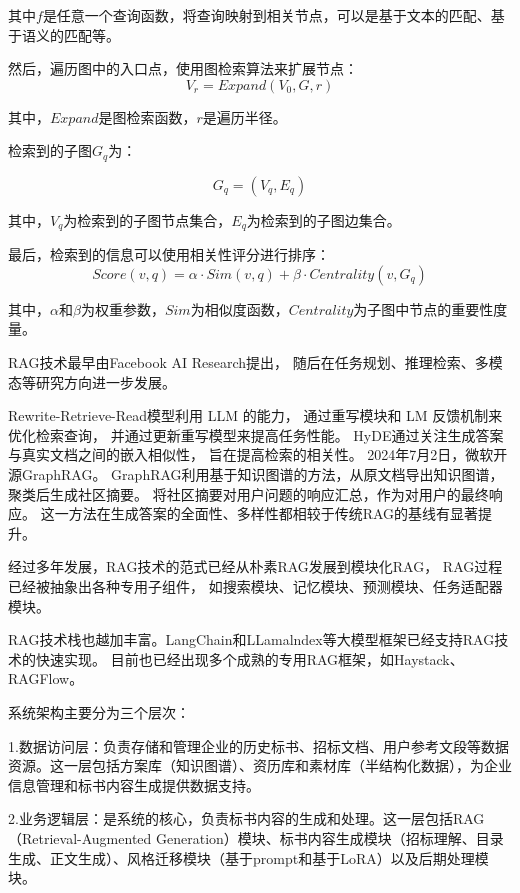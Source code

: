 \documentclass{xmu}
\begin{document}
其中$f$是任意一个查询函数，将查询映射到相关节点，可以是基于文本的匹配、基于语义的匹配等。

然后，遍历图中的入口点，使用图检索算法来扩展节点：
$$
V_r = Expand(V_0, G, r)
$$

其中，$Expand$是图检索函数，$r$是遍历半径。

检索到的子图$G_q$为：

$$
G_q = (V_q, E_q)
$$

其中，$V_q$为检索到的子图节点集合，$E_q$为检索到的子图边集合。

最后，检索到的信息可以使用相关性评分进行排序：
$$
Score(v, q) = \alpha \cdot Sim(v, q) + \beta \cdot Centrality(v, G_q)
$$

其中，$\alpha$和$\beta$为权重参数，$Sim$为相似度函数，$Centrality$为子图中节点的重要性度量。

RAG技术最早由Facebook AI Research提出，
随后在任务规划、推理检索、多模态等研究方向进一步发展。

Rewrite-Retrieve-Read模型利用 LLM 的能力，
通过重写模块和 LM 反馈机制来优化检索查询，
并通过更新重写模型来提高任务性能\cite{RRR}。
HyDE通过关注生成答案与真实文档之间的嵌入相似性，
旨在提高检索的相关性\cite{HyDE}。
2024年7月2日，微软开源GraphRAG\cite{graphRAG}。
GraphRAG利用基于知识图谱的方法，从原文档导出知识图谱，聚类后生成社区摘要。
将社区摘要对用户问题的响应汇总，作为对用户的最终响应。
这一方法在生成答案的全面性、多样性都相较于传统RAG的基线有显著提升。

经过多年发展，RAG技术的范式已经从朴素RAG发展到模块化RAG，
RAG过程已经被抽象出各种专用子组件，
如搜索模块、记忆模块、预测模块、任务适配器模块。\cite{RAG}

RAG技术栈也越加丰富。LangChain和LLamalndex等大模型框架已经支持RAG技术的快速实现。
目前也已经出现多个成熟的专用RAG框架，如Haystack、RAGFlow。



系统架构主要分为三个层次：

1.数据访问层：负责存储和管理企业的历史标书、招标文档、用户参考文段等数据资源。这一层包括方案库（知识图谱）、资历库和素材库（半结构化数据），为企业信息管理和标书内容生成提供数据支持。

2.业务逻辑层：是系统的核心，负责标书内容的生成和处理。这一层包括RAG（Retrieval-Augmented Generation）模块、标书内容生成模块（招标理解、目录生成、正文生成）、风格迁移模块（基于prompt和基于LoRA）以及后期处理模块。
\end{document}
